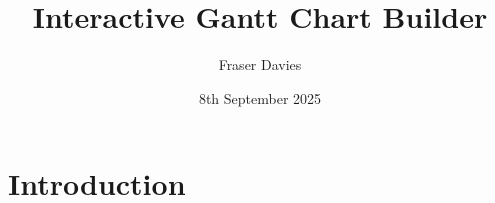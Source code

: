 \documentclass{article}
\title{Interactive Gantt Chart Builder}
\author{Fraser Davies}
\date{8th September 2025}
\begin{document}
\maketitle

\section{Introduction}
\end{document}
